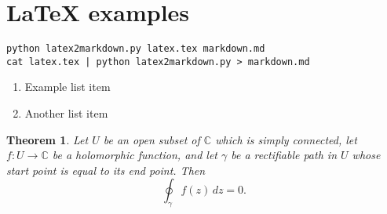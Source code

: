 \documentclass[12pt]{amsart}
\theoremstyle{plain}%
\newtheorem{thm}{Theorem}[section]
\begin{document}
\section{LaTeX examples}

\begin{lstlisting}
python latex2markdown.py latex.tex markdown.md
cat latex.tex | python latex2markdown.py > markdown.md
\end{lstlisting}

\begin{enumerate}
    \item Example list item
    \item Another list item
\end{enumerate}

\begin{thm}
    Let $U$ be an open subset of $\mathbb{C}$ which is simply connected, let $f: U \rightarrow \mathbb{C}$ be a holomorphic function, and let $\gamma$ be a rectifiable path in $U$ whose start point is equal to its end point.  Then \[
    \oint_\gamma f(z) \, dz = 0.
\] 
\end{thm}
\end{document}
